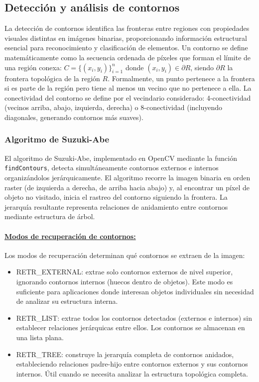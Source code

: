 \subsection{Detección y análisis de contornos}

La detección de contornos identifica las fronteras entre regiones con propiedades visuales distintas en imágenes binarias, proporcionando información estructural esencial para reconocimiento y clasificación de elementos. Un contorno se define matemáticamente como la secuencia ordenada de píxeles que forman el límite de una región conexa: $C = \{(x_i, y_i)\}_{i=1}^{n}$ donde $(x_i, y_i) \in \partial R$, siendo $\partial R$ la frontera topológica de la región $R$. Formalmente, un punto pertenece a la frontera si es parte de la región pero tiene al menos un vecino que no pertenece a ella. La conectividad del contorno se define por el vecindario considerado: 4-conectividad (vecinos arriba, abajo, izquierda, derecha) o 8-conectividad (incluyendo diagonales, generando contornos más suaves).

\subsubsection{Algoritmo de Suzuki-Abe}

El algoritmo de Suzuki-Abe, implementado en OpenCV mediante la función \texttt{findContours}, detecta simultáneamente contornos externos e internos organizándolos jerárquicamente. El algoritmo recorre la imagen binaria en orden raster (de izquierda a derecha, de arriba hacia abajo) y, al encontrar un píxel de objeto no visitado, inicia el rastreo del contorno siguiendo la frontera. La jerarquía resultante representa relaciones de anidamiento entre contornos mediante estructura de árbol.

\paragraph{\underline{Modos de recuperación de contornos:}}

Los modos de recuperación determinan qué contornos se extraen de la imagen:

\begin{itemize}[label=$\bullet$]
\item RETR\_EXTERNAL: extrae solo contornos externos de nivel superior, ignorando contornos internos (huecos dentro de objetos). Este modo es suficiente para aplicaciones donde interesan objetos individuales sin necesidad de analizar su estructura interna.

\item RETR\_LIST: extrae todos los contornos detectados (externos e internos) sin establecer relaciones jerárquicas entre ellos. Los contornos se almacenan en una lista plana.

\item RETR\_TREE: construye la jerarquía completa de contornos anidados, estableciendo relaciones padre-hijo entre contornos externos y sus contornos internos. Útil cuando se necesita analizar la estructura topológica completa.
\end{itemize}

